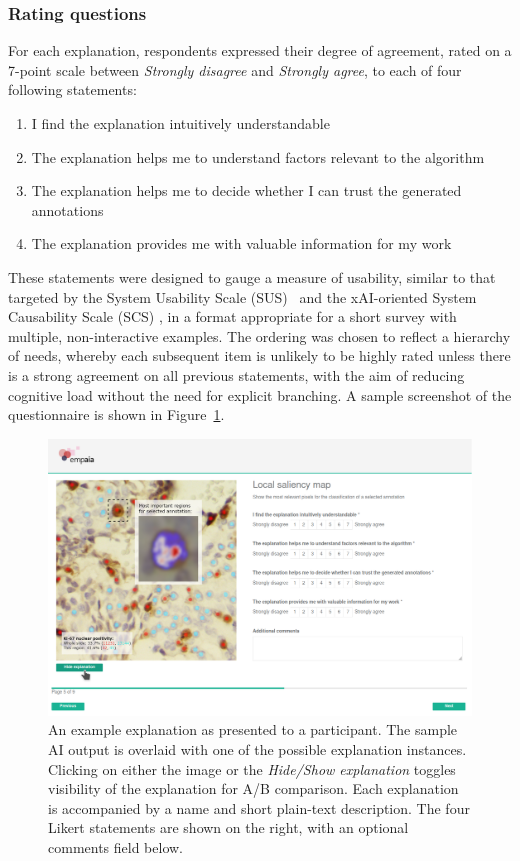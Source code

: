 \subsubsection{Rating questions}
 For each explanation, respondents expressed their degree of agreement, rated on a 7-point scale between \textit{Strongly disagree} and \textit{Strongly agree}, to each of four following statements:

 \begin{enumerate}
    \item I find the explanation intuitively understandable
    \item The explanation helps me to understand factors relevant to the algorithm
    \item The explanation helps me to decide whether I can trust the generated annotations
    \item The explanation provides me with valuable information for my work
\end{enumerate}

These statements were designed to gauge a measure of usability, similar to that targeted by the System Usability Scale (SUS)~\cite{brooke1996sus} and the xAI-oriented System Causability Scale (SCS) \cite{HolzingerEtAl:2020:QualityOfExplanations}, in a format appropriate for a short survey with multiple, non-interactive examples. The ordering was chosen to reflect a hierarchy of needs, whereby each subsequent item is unlikely to be highly rated unless there is a strong agreement on all previous statements, with the aim of reducing cognitive load without the need for explicit branching. A sample screenshot of the questionnaire is shown in Figure~\ref{fig:examplepage}.

 \begin{figure}[ht]
    \centering
    \includegraphics[width=0.75\linewidth]{Graphics/3CaseStudyDesign/example_page.png}
    \caption{An example explanation as presented to a participant. The sample AI output is overlaid with one of the possible explanation instances. Clicking on either the image or the \emph{Hide/Show explanation} toggles visibility of the explanation for A/B comparison. Each explanation is accompanied by a name and short plain-text description. The four Likert statements are shown on the right, with an optional comments field below.}
    \label{fig:examplepage}
 \end{figure}
 
